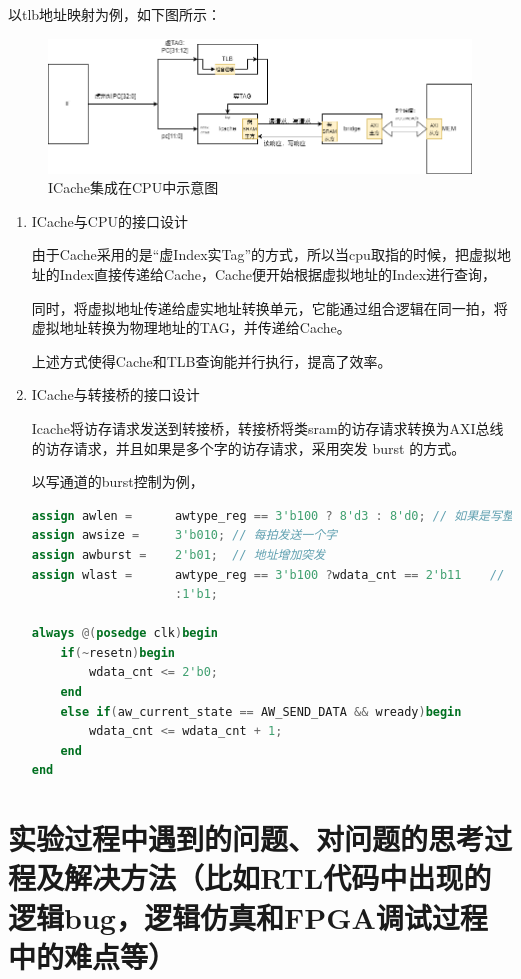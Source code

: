 \documentclass[11pt]{article}
\begin{document}
以tlb地址映射为例，如下图所示：
\begin{figure}[H]
    \centering
    \includegraphics[width=\textwidth]{fig/fig3.png}
    \caption{ICache集成在CPU中示意图}
    \label{fig:3}
\end{figure}
\begin{enumerate}
    \item ICache与CPU的接口设计
    
由于Cache采用的是“虚Index实Tag”的方式，所以当cpu取指的时候，把虚拟地址的Index直接传递给Cache，Cache便开始根据虚拟地址的Index进行查询，

同时，将虚拟地址传递给虚实地址转换单元，它能通过组合逻辑在同一拍，将虚拟地址转换为物理地址的TAG，并传递给Cache。

上述方式使得Cache和TLB查询能并行执行，提高了效率。

    \item ICache与转接桥的接口设计
    
    Icache将访存请求发送到转接桥，转接桥将类sram的访存请求转换为AXI总线的访存请求，并且如果是多个字的访存请求，采用突发 burst 的方式。

    以写通道的burst控制为例，
    \begin{lstlisting}[language=verilog]
assign awlen =      awtype_reg == 3'b100 ? 8'd3 : 8'd0; // 如果是写整个cache行，burst长度为3
assign awsize =     3'b010; // 每拍发送一个字
assign awburst =    2'b01;  // 地址增加突发
assign wlast =      awtype_reg == 3'b100 ?wdata_cnt == 2'b11    // 最后一个字，拉高wlast
                    :1'b1;

always @(posedge clk)begin
    if(~resetn)begin
        wdata_cnt <= 2'b0;
    end
    else if(aw_current_state == AW_SEND_DATA && wready)begin
        wdata_cnt <= wdata_cnt + 1;
    end
end
    \end{lstlisting}

\end{enumerate}





\section{实验过程中遇到的问题、对问题的思考过程及解决方法（比如RTL代码中出现的逻辑bug，逻辑仿真和FPGA调试过程中的难点等）}
\end{document}
